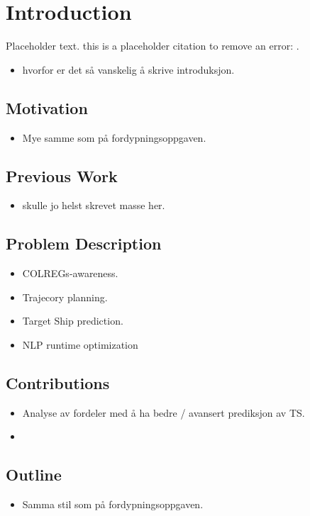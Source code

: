 \section{Introduction}
Placeholder text. this is a placeholder citation to remove an error: \cite{breivik2017mpc}.
\begin{itemize}
    \item hvorfor er det så vanskelig å skrive introduksjon.
\end{itemize}
\subsection{Motivation}
\begin{itemize}
    \item Mye samme som på fordypningsoppgaven.

\end{itemize}

\subsection{Previous Work}
\begin{itemize}
    \item skulle jo helst skrevet masse her.
\end{itemize}

\subsection{Problem Description}
\begin{itemize}
    \item COLREGs-awareness.
    \item Trajecory planning.
    \item Target Ship prediction.
    \item NLP runtime optimization
\end{itemize}

\subsection{Contributions}
\begin{itemize}
    \item Analyse av fordeler med å ha bedre / avansert prediksjon av TS.
    \item 
\end{itemize}

\subsection{Outline}
\begin{itemize}
    \item Samma stil som på fordypningsoppgaven.
\end{itemize}

